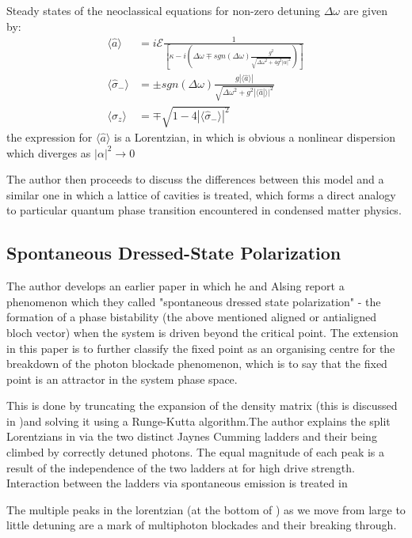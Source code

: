 \documentclass[reqno]{amsart}
\newcommand{\ann}{\hat{a}}
\newcommand{\atann}{\hat{\sigma}_-}
\newcommand{\qexp}[1]{\langle #1 \rangle}
\newcommand{\Epsilon}{\mathcal{E}}
\begin{document}
Steady states of the neoclassical equations for non-zero detuning $\Delta \omega$ are given by:
\begin{align}
	\qexp{\ann}& = i \Epsilon\frac{1}{[\kappa-i(\Delta \omega \mp sgn(\Delta \omega) \frac{g^2}{\sqrt{\Delta \omega^2 +4g^2 |\alpha|^2}})]} \\
	\qexp{\atann}& = \pm sgn(\Delta \omega) \frac{g |\qexp{\ann}|}{\sqrt{\Delta \omega^2 + g^2 |\qexp{\ann|}|^2}}\\
	\qexp{\sigma_z}& = \mp \sqrt{1-4|\qexp{\atann}|^2}
\end{align}
the expression for $\qexp{\ann}$ is a Lorentzian, in which is obvious a nonlinear dispersion which diverges as $|\alpha|^2 \rightarrow 0$

The author then proceeds to discuss the differences between this model and a similar one in which a lattice of cavities is treated, which forms a direct analogy to particular quantum phase transition encountered in condensed matter physics.

\subsection{Spontaneous Dressed-State Polarization}
The author develops an earlier paper \autocite{Alsing1999} in which he and Alsing report a phenomenon which they called "spontaneous dressed state polarization" - the formation of a phase bistability (the above mentioned aligned or antialigned bloch vector) when the system is driven beyond the critical point. The extension in this paper is to further classify the fixed point as an organising centre for the breakdown of the photon blockade phenomenon, which is to say that the fixed point is an attractor in the system phase space. 

This is done by truncating the expansion of the density matrix (this is discussed in \autocite{Savage1988})and solving it using a Runge-Kutta algorithm.The author explains the split Lorentzians in \autocite[Figure 1]{Carmichael2015} via the two distinct Jaynes Cumming ladders and their being climbed by correctly detuned photons. The equal magnitude of each peak is a result of the independence of the two ladders at for high drive strength. Interaction between the ladders via spontaneous emission is treated in \autocite[Section V]{Carmichael2015}

The multiple peaks in the lorentzian (at the bottom of \autocite[Figure 1]{Carmichael2015}) as we move from large to little detuning are a mark of multiphoton blockades and their breaking through.
\end{document}
